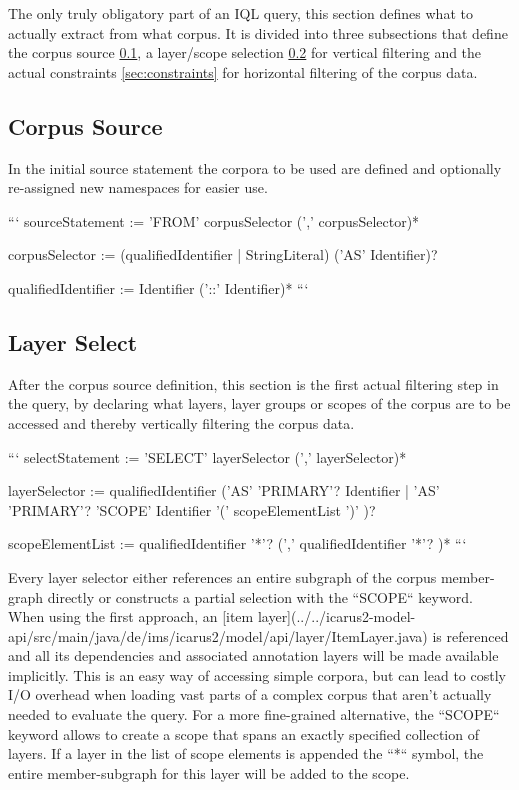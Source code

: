 \documentclass[11pt]{article}
\begin{document}
The only truly obligatory part of an IQL query, this section defines what to actually extract from what corpus. It is divided into three subsections that define the corpus source \cref{sec:corpus-source}, a layer/scope selection \cref{sec:layer-select} for vertical filtering and the actual constraints \cref{sec:constraints} for horizontal filtering of the corpus data. 

\subsection{Corpus Source}
\label{sec:corpus-source}

In the initial source statement the corpora to be used are defined and optionally re-assigned new namespaces for easier use.

```
sourceStatement := 'FROM' corpusSelector (',' corpusSelector)*

corpusSelector := (qualifiedIdentifier | StringLiteral) ('AS' Identifier)?

qualifiedIdentifier := Identifier ('::' Identifier)*
```

\subsection{Layer Select}
\label{sec:layer-select}

After the corpus source definition, this section is the first actual filtering step in the query, by declaring what layers, layer groups or scopes of the corpus are to be accessed and thereby vertically filtering the corpus data.

```
selectStatement := 'SELECT' layerSelector (',' layerSelector)*

layerSelector := qualifiedIdentifier ('AS' 'PRIMARY'? Identifier | 'AS' 'PRIMARY'? 'SCOPE' Identifier '(' scopeElementList ')' )?

scopeElementList := qualifiedIdentifier '*'? (',' qualifiedIdentifier '*'? )*
```

Every layer selector either references an entire subgraph of the corpus member-graph directly or constructs a partial selection with the ``SCOPE`` keyword. When using the first approach, an [item layer](../../icarus2-model-api/src/main/java/de/ims/icarus2/model/api/layer/ItemLayer.java) is referenced and all its dependencies and associated annotation layers will be made available implicitly. This is an easy way of accessing simple corpora, but can lead to costly I/O overhead when loading vast parts of a complex corpus that aren't actually needed to evaluate the query. For a more fine-grained alternative, the ``SCOPE`` keyword allows to create a scope that spans an exactly specified collection of layers. If a layer in the list of scope elements is appended the ``*`` symbol, the entire member-subgraph for this layer will be added to the scope.
\end{document}
